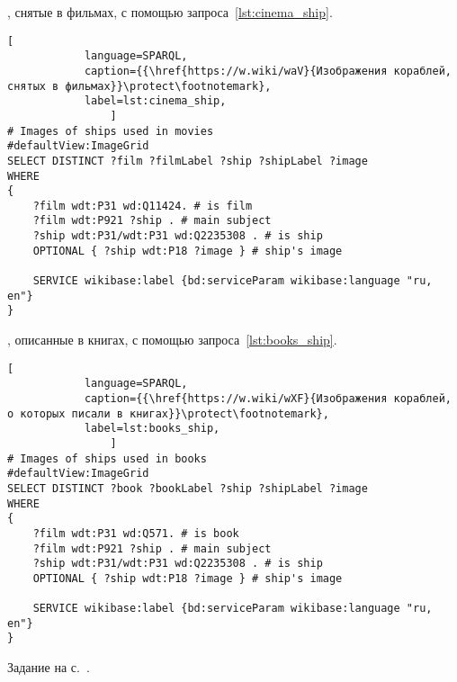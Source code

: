 \newpage
\begin{task}
\label{answer:ship_1}

, снятые в фильмах, с помощью запроса~\ref{lst:cinema_ship}. 

\begin{lstlisting}[ 
            language=SPARQL, 
            caption={{\href{https://w.wiki/waV}{Изображения кораблей, снятых в фильмах}}\protect\footnotemark}, 
            label=lst:cinema_ship, 
                ]
# Images of ships used in movies
#defaultView:ImageGrid
SELECT DISTINCT ?film ?filmLabel ?ship ?shipLabel ?image
WHERE
{
	?film wdt:P31 wd:Q11424. # is film	
	?film wdt:P921 ?ship . # main subject
	?ship wdt:P31/wdt:P31 wd:Q2235308 . # is ship
	OPTIONAL { ?ship wdt:P18 ?image } # ship's image
								
	SERVICE wikibase:label {bd:serviceParam wikibase:language "ru, en"}
}
\end{lstlisting}



, описанные в книгах, с помощью запроса~\ref{lst:books_ship}. 
\begin{lstlisting}[ 
            language=SPARQL, 
            caption={{\href{https://w.wiki/wXF}{Изображения кораблей, о которых писали в книгах}}\protect\footnotemark}, 
            label=lst:books_ship, 
                ]
# Images of ships used in books
#defaultView:ImageGrid
SELECT DISTINCT ?book ?bookLabel ?ship ?shipLabel ?image
WHERE
{
	?film wdt:P31 wd:Q571. # is book	
	?film wdt:P921 ?ship . # main subject
	?ship wdt:P31/wdt:P31 wd:Q2235308 . # is ship
	OPTIONAL { ?ship wdt:P18 ?image } # ship's image
									
	SERVICE wikibase:label {bd:serviceParam wikibase:language "ru, en"}
}
\end{lstlisting}
	
\small{Задание на с.~\pageref{question:ship_1}.}
\end{task}






